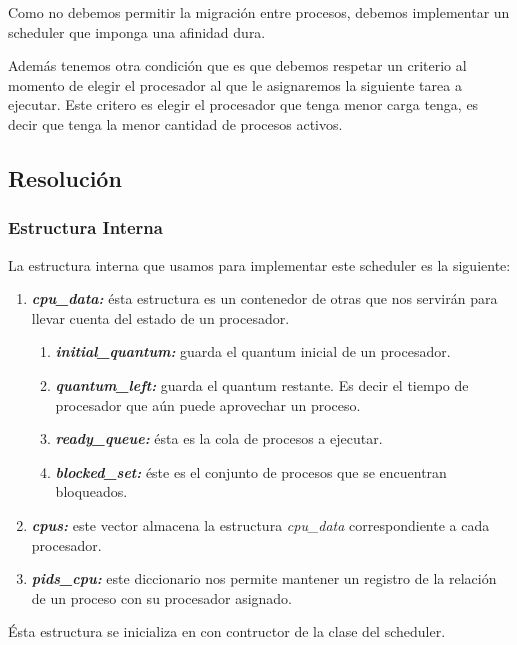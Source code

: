 \documentclass[a4paper,11pt]{article}
\begin{document}
		Como no debemos permitir la migración entre procesos, debemos implementar un scheduler que imponga una afinidad dura.
		
		Además tenemos otra condición que es que debemos respetar un criterio al momento de elegir el procesador al que le asignaremos la siguiente tarea a ejecutar. Este critero es elegir el procesador que tenga menor carga tenga, es decir que tenga la menor cantidad de procesos activos.
		
	\subsection{Resolución}
		\subsubsection*{Estructura Interna}
			La estructura interna que usamos para implementar este scheduler es la siguiente:

			
			
			\begin{enumerate}
				\item \emph{\textbf{cpu\_data:}} ésta estructura es un contenedor de otras que nos servirán para llevar cuenta del estado de un procesador.
				\begin{enumerate}
					\item \emph{\textbf{initial\_quantum:}} guarda el quantum inicial de un procesador.
					\item \emph{\textbf{quantum\_left:}} guarda el quantum restante. Es decir el tiempo de procesador que aún puede aprovechar un proceso.
					\item \emph{\textbf{ready\_queue:}} ésta es la cola de procesos a ejecutar.
					\item \emph{\textbf{blocked\_set:}} éste es el conjunto de procesos que se encuentran bloqueados.
				\end{enumerate}
				\item \emph{\textbf{cpus:}} este vector almacena la estructura \textit{cpu\_data} correspondiente a cada procesador.
				\item \emph{\textbf{pids\_cpu:}} este diccionario nos permite mantener un registro de la relación de un proceso con su procesador asignado.
			\end{enumerate}
			
			Ésta estructura se inicializa en con contructor de la clase del scheduler.
\end{document}
